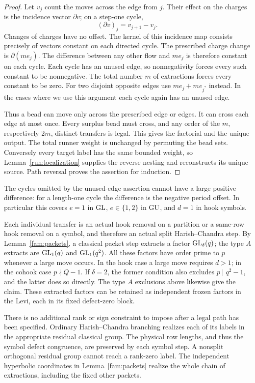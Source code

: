 \begin{proof}
Let \(v_j\) count the moves across the edge from \(j\).
Their effect on the charges is the incidence vector \(\partial v\);
on a step-one cycle,
\[
 (\partial v)_j=v_{j+1}-v_j.
\]
Changes of charges have no offset.  The kernel of this incidence
map consists precisely of vectors constant on each directed cycle.
The prescribed charge change is \(\partial(me_j)\).
The difference between any other flow and \(me_j\) is therefore
constant on each cycle.  Each cycle has an unused edge, so
nonnegativity forces every such constant to be nonnegative.
The total number \(m\) of extractions forces every constant to be
zero.  For two disjoint opposite edges use
\(me_j+me_{j^*}\) instead.  In the cases where we use this
argument each cycle again has an unused edge.

Thus a bead can move only across the prescribed edge or edges.
It can cross each edge at most once.  Every surplus bead must
cross, and any order of the \(m\), respectively \(2m\), distinct
transfers is legal.  This gives the factorial and the unique
output.  The total runner weight is unchanged by permuting the
bead sets.  Conversely every target label has the same bounded
weight, so Lemma~\ref{run:localization} supplies the reverse
nesting and reconstructs its unique source.  Path reversal proves
the assertion for induction.
\end{proof}

The cycles omitted by the unused-edge assertion cannot have a
large positive difference: for a length-one cycle the difference
is the negative period offset.  In particular this covers
\(e=1\) in \(\operatorname{GL}\), \(e\in\{1,2\}\) in \(\operatorname{GU}\), and \(d=1\)
in hook symbols.

Each individual transfer is an actual hook removal on a partition
or a same-row hook removal on a symbol, and therefore an actual
split Harish--Chandra step.  By Lemma~\ref{fam:packets}, a
classical packet step extracts a factor \(\operatorname{GL}_\delta(q)\);
the type \(A\) extracts are \(\operatorname{GL}_1(q)\) and \(\operatorname{GL}_1(q^2)\).
All these factors have order prime to \(p\) whenever a large
move occurs.  In the hook case a large move requires \(d>1\);
in the cohook case \(p\nmid Q-1\).  If \(\delta=2\), the former
condition also excludes \(p\mid q^2-1\), and the latter does so
directly.  The type \(A\) exclusions above likewise give the claim.
These extracted factors can be retained as independent frozen
factors in the Levi, each in its fixed defect-zero block.

There is no additional rank or sign constraint to impose after a
legal path has been specified.  Ordinary Harish--Chandra branching
realizes each of its labels in the appropriate residual classical
group.  The physical row lengths, and thus the symbol defect
congruence, are preserved by each symbol step.  A nonsplit
orthogonal residual group cannot reach a rank-zero label.
The independent hyperbolic coordinates in
Lemma~\ref{fam:packets} realize the whole chain of extractions,
including the fixed other packets.

